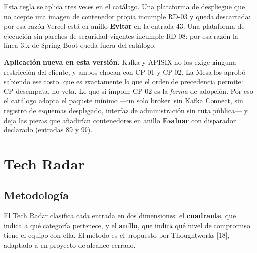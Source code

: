 \documentclass[11pt,a4paper]{article}
\newcommand{\evaluar}{\textcolor{ringEvaluar}{\textbf{Evaluar}}}
\newcommand{\evitar}{\textcolor{ringEvitar}{\textbf{Evitar}}}
\begin{document}
Esta regla se aplica tres veces en el catálogo. Una plataforma de despliegue que no acepte una imagen de contenedor propia incumple RD-03 y queda descartada: por esa razón Vercel está en anillo \evitar{} en la entrada 43. Una plataforma de ejecución sin parches de seguridad vigentes incumple RD-08: por esa razón la línea 3.x de Spring Boot queda fuera del catálogo.

\vspace{0.2cm}
\noindent\textbf{Aplicación nueva en esta versión.} Kafka y APISIX no los exige ninguna restricción del cliente, y ambos chocan con CP-01 y CP-02. La Mesa los aprobó sabiendo ese costo, que es exactamente lo que el orden de precedencia permite: CP desempata, no veta. Lo que sí impone CP-02 es la \emph{forma} de adopción. Por eso el catálogo adopta el paquete mínimo ---un solo broker, sin Kafka Connect, sin registro de esquemas desplegado, interfaz de administración sin ruta pública--- y deja las piezas que añadirían contenedores en anillo \evaluar{} con disparador declarado (entradas 89 y 90).

\section{Tech Radar}
\label{sec:radar}

\subsection{Metodología}

El Tech Radar clasifica cada entrada en dos dimensiones: el \textbf{cuadrante}, que indica a qué categoría pertenece, y el \textbf{anillo}, que indica qué nivel de compromiso tiene el equipo con ella. El método es el propuesto por Thoughtworks {[}18{]}, adaptado a un proyecto de alcance cerrado.
\end{document}
